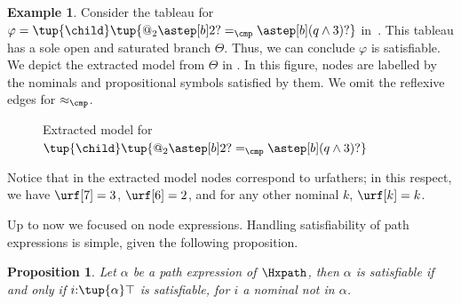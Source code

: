 \documentclass[10pt,a4paper]{amsart}
\newtheorem{prop}[thm]{Proposition}
\theoremstyle{definition}
\newtheorem{exa}[thm]{Example}
\theoremstyle{remark}
\begin{document}
\begin{exa}
    \label{ex:extracted model}
    Consider the tableau for $\varphi = \tup{\child}\tup{@_2\astep[b]2? =_\cmp \astep[b](q\land 3)?}$ in~.
    This tableau has a sole open and saturated branch $\Theta$.
    Thus, we can conclude $\varphi$ is satisfiable.
    We depict the extracted model from $\Theta$ in .
    In this figure, nodes are labelled by the nominals and propositional symbols satisfied by them.
    We omit the reflexive edges for $\approx_\cmp$.
    \begin{figure}[t]
        \centering
        \caption{Extracted model for $\tup{\child}\tup{@_2\astep[b]2? =_\cmp \astep[b](q\land 3)?}$}
        \label{ex:extracted:model}
    \end{figure}
    Notice that in the extracted model nodes correspond to urfathers; in this respect, we have $\urf[7]=3$, $\urf[6]=2$, and for any other nominal $k$, $\urf[k]=k$.
\end{exa}

Up to now we focused on node expressions.  Handling satisfiability of path expressions is simple, given the following proposition. 

\begin{prop}
	Let $\alpha$ be a path expression of $\Hxpath$, then $\alpha$ is satisfiable if and only if $i{:}\tup{\alpha}\top$ is satisfiable, for $i$ a nominal not in $\alpha$. 
\end{prop}	
\end{document}
